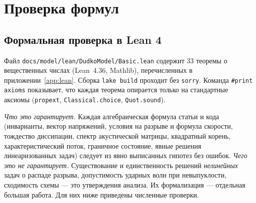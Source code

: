 \documentclass[11pt,a4paper]{article}
\theoremstyle{definition}
\theoremstyle{remark}
\begin{document}
\section{Проверка формул}\label{sec:verify}

\subsection{Формальная проверка в Lean 4}
Файл \texttt{docs/model/lean/DudkoModel/Basic.lean} содержит 33 теоремы о вещественных числах
(Lean~4.36, Mathlib), перечисленных в приложении~\ref{app:lean}. Сборка
\texttt{lake build} проходит без \texttt{sorry}. Команда \texttt{\#print axioms} показывает, что
каждая теорема опирается только на стандартные аксиомы (\texttt{propext}, \texttt{Classical.choice},
\texttt{Quot.sound}).

\emph{Что это гарантирует.} Каждая алгебраическая формула статьи и кода (инварианты, вектор
напряжений, условия на разрыве и формула скорости, тождество диссипации, спектр акустической матрицы,
квадратный корень, характеристический поток, граничное состояние, явные решения линеаризованных задач)
следует из явно выписанных гипотез без ошибок. \emph{Чего это не гарантирует.} Существование и
единственность решений \emph{нелинейных} задач о распаде разрыва, допустимость ударных волн при
невыпуклости, сходимость схемы --- это утверждения анализа. Их формализация --- отдельная большая
работа. Для них ниже приведены численные проверки.
\end{document}
